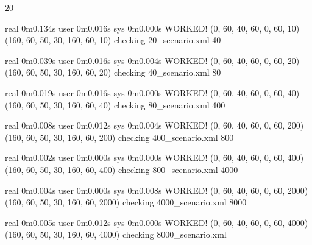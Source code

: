 20

real	0m0.134s
user	0m0.016s
sys	0m0.000s
WORKED! (0, 60, 40, 60, 0, 60, 10) (160, 60, 50, 30, 160, 60, 10) checking 20_scenario.xml
40

real	0m0.039s
user	0m0.016s
sys	0m0.004s
WORKED! (0, 60, 40, 60, 0, 60, 20) (160, 60, 50, 30, 160, 60, 20) checking 40_scenario.xml
80

real	0m0.019s
user	0m0.016s
sys	0m0.000s
WORKED! (0, 60, 40, 60, 0, 60, 40) (160, 60, 50, 30, 160, 60, 40) checking 80_scenario.xml
400

real	0m0.008s
user	0m0.012s
sys	0m0.004s
WORKED! (0, 60, 40, 60, 0, 60, 200) (160, 60, 50, 30, 160, 60, 200) checking 400_scenario.xml
800

real	0m0.002s
user	0m0.000s
sys	0m0.000s
WORKED! (0, 60, 40, 60, 0, 60, 400) (160, 60, 50, 30, 160, 60, 400) checking 800_scenario.xml
4000

real	0m0.004s
user	0m0.000s
sys	0m0.008s
WORKED! (0, 60, 40, 60, 0, 60, 2000) (160, 60, 50, 30, 160, 60, 2000) checking 4000_scenario.xml
8000

real	0m0.005s
user	0m0.012s
sys	0m0.000s
WORKED! (0, 60, 40, 60, 0, 60, 4000) (160, 60, 50, 30, 160, 60, 4000) checking 8000_scenario.xml
